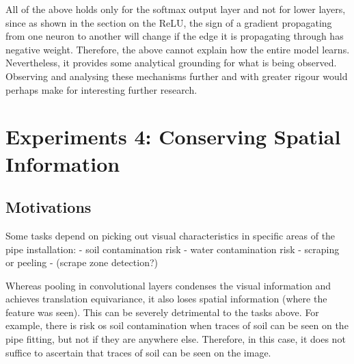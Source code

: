 \documentclass[a4paper,11pt]{article}
\begin{document}
All of the above holds only for the softmax output layer and not for lower layers, since as shown in the section on the ReLU, the sign of a gradient propagating from one neuron to another will change if the edge it is propagating through has negative weight. Therefore, the above cannot explain how the entire model learns. Nevertheless, it provides some analytical grounding for what is being observed. Observing and analysing these mechanisms further and with greater rigour would perhaps make for interesting further research.

%
%




\section{Experiments 4: Conserving Spatial Information}

\subsection{Motivations}

Some tasks depend on picking out visual characteristics in specific areas of the pipe installation:
- soil contamination risk
- water contamination risk
- scraping or peeling
- (scrape zone detection?)

Whereas pooling in convolutional layers condenses the visual information and achieves translation equivariance, it also loses spatial information (where the feature was seen). This can be severely detrimental to the tasks above. For example, there is risk os soil contamination when traces of soil can be seen on the pipe fitting, but not if they are anywhere else. Therefore, in this case, it does not suffice to ascertain that traces of soil can be seen on the image. \\
\end{document}
